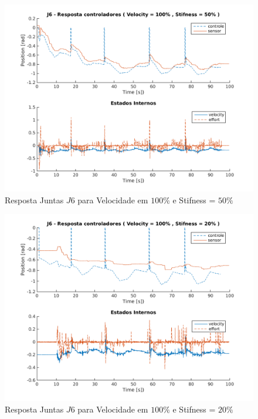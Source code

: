 \vspace{1cm}

\begin{figure}[H]
    \centering
    \includegraphics[width=0.6\linewidth,trim={2cm 1cm 2cm 2cm}]{tex/figs/squareStiffJ6stateEval_J6v100s50.png}
    \caption{Resposta Juntas $J6$ para Velocidade em $100\%$ e Stifness = $50\%$ }
    \label{fig:squareStiffJ6stateEval_J6v100s50}
\end{figure}

\vspace{1cm}

\begin{figure}[H]
    \centering
    \includegraphics[width=0.6\linewidth,trim={2cm 1cm 2cm 2cm}]{tex/figs/squareStiffJ7stateEval_J6v100s20.png}
    \caption{Resposta Juntas $J6$ para Velocidade em $100\%$ e Stifness = $20\%$ }
    \label{fig:squareStiffJ7stateEval_J6v100s20}
\end{figure}